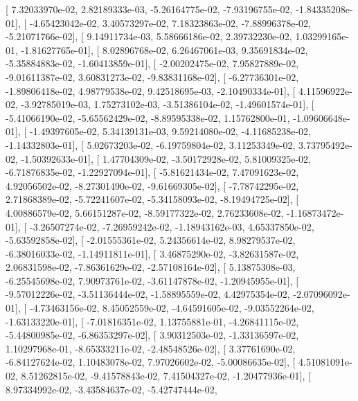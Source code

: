 \documentclass{article}
\begin{document}
       [  7.32033970e-02,   2.82189333e-03,  -5.26164775e-02,
         -7.93196755e-02,  -1.84335208e-01],
       [ -4.65423042e-02,   3.40573297e-02,   7.18323863e-02,
         -7.88996378e-02,  -5.21071766e-02],
       [  9.14911734e-03,   5.58666186e-02,   2.39732230e-02,
          1.03299165e-01,  -1.81627765e-01],
       [  8.02896768e-02,   6.26467061e-03,   9.35691834e-02,
         -5.35884883e-02,  -1.60413859e-01],
       [ -2.00202475e-02,   7.95827889e-02,  -9.01611387e-02,
          3.60831273e-02,  -9.83831168e-02],
       [ -6.27736301e-02,  -1.89806418e-02,   4.98779538e-02,
          9.42518695e-03,  -2.10490334e-01],
       [  4.11596922e-02,  -3.92785019e-03,   1.75273102e-03,
         -3.51386104e-02,  -1.49601574e-01],
       [ -5.41066190e-02,  -5.65562429e-02,  -8.89595338e-02,
          1.15762800e-01,  -1.09606648e-01],
       [ -1.49397605e-02,   5.34139131e-03,   9.59214080e-02,
         -4.11685238e-02,  -1.14332803e-01],
       [  5.02673203e-02,  -6.19759804e-02,   3.11253349e-02,
          3.73795492e-02,  -1.50392633e-01],
       [  1.47704309e-02,  -3.50172928e-02,   5.81009325e-02,
         -6.71876835e-02,  -1.22927094e-01],
       [ -5.81621434e-02,   7.47091623e-02,   4.92056502e-02,
         -8.27301490e-02,  -9.61669305e-02],
       [ -7.78742295e-02,   2.71868389e-02,  -5.72241607e-02,
         -5.34158093e-02,  -8.19494725e-02],
       [  4.00886579e-02,   5.66151287e-02,  -8.59177322e-02,
          2.76233608e-02,  -1.16873472e-01],
       [ -3.26507274e-02,  -7.26959242e-02,  -1.18943162e-03,
          4.65337850e-02,  -5.63592858e-02],
       [ -2.01555361e-02,   5.24356614e-02,   8.98279537e-02,
         -6.38016033e-02,  -1.14911811e-01],
       [  3.46875290e-02,  -3.82631587e-02,   2.06831598e-02,
         -7.86361629e-02,  -2.57108164e-02],
       [  5.13875308e-03,  -6.25545698e-02,   7.90973761e-02,
         -3.61147878e-02,  -1.20945955e-01],
       [ -9.57012226e-02,  -3.51136444e-02,  -1.58895559e-02,
          4.42975354e-02,  -2.07096092e-01],
       [ -4.73463156e-02,   8.45052559e-02,  -4.64591605e-02,
         -9.03552264e-02,  -1.63133220e-01],
       [ -7.01816351e-02,   1.13755881e-01,  -4.26841115e-02,
         -5.44800985e-02,  -6.86353297e-02],
       [  3.90312503e-02,  -1.33136597e-02,   1.10297968e-01,
         -8.65333211e-02,  -2.48548526e-02],
       [  3.37761690e-02,  -6.84127624e-02,   1.10483078e-02,
          7.97026602e-02,  -5.00086635e-02],
       [  4.51081091e-02,   8.51262815e-02,  -9.41578843e-02,
          7.41504327e-02,  -1.20477936e-01],
       [  8.97334992e-02,  -3.43584637e-02,  -5.42747444e-02,
\end{document}
